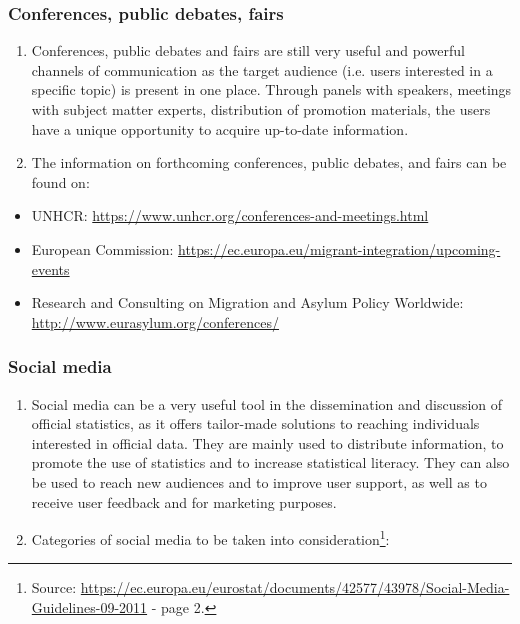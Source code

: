 \documentclass[
]{article}
\begin{document}
\hypertarget{conferences-public-debates-fairs}{%
\subsubsection{Conferences, public debates, fairs}\label{conferences-public-debates-fairs}}

\begin{enumerate}
\def\labelenumi{\arabic{enumi}.}
\setcounter{enumi}{525}
\item
  Conferences, public debates and fairs are still very useful and
  powerful channels of communication as the target audience (i.e.
  users interested in a specific topic) is present in one place.
  Through panels with speakers, meetings with subject matter experts,
  distribution of promotion materials, the users have a unique
  opportunity to acquire up-to-date information.
\item
  The information on forthcoming conferences, public debates, and
  fairs can be found on:
\end{enumerate}

\begin{itemize}
\item
  UNHCR: \url{https://www.unhcr.org/conferences-and-meetings.html}
\item
  European Commission:
  \url{https://ec.europa.eu/migrant-integration/upcoming-events}
\item
  Research and Consulting on Migration and Asylum Policy Worldwide:
  \url{http://www.eurasylum.org/conferences/}
\end{itemize}

\hypertarget{social-media}{%
\subsubsection{Social media}\label{social-media}}

\begin{enumerate}
\def\labelenumi{\arabic{enumi}.}
\setcounter{enumi}{527}
\item
  Social media can be a very useful tool in the dissemination and
  discussion of official statistics, as it offers tailor-made
  solutions to reaching individuals interested in official data. They
  are mainly used to distribute information, to promote the use of
  statistics and to increase statistical literacy. They can also be
  used to reach new audiences and to improve user support, as well as
  to receive user feedback and for marketing purposes.
\item
  Categories of social media to be taken into consideration\footnote{Source:
    \url{https://ec.europa.eu/eurostat/documents/42577/43978/Social-Media-Guidelines-09-2011}
    - page 2.}:
\end{enumerate}
\end{document}
